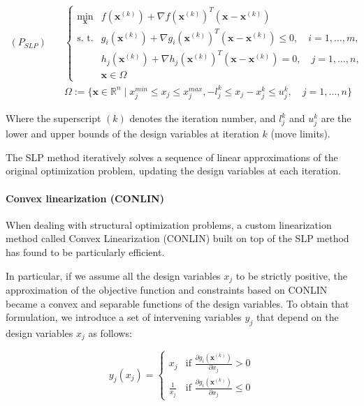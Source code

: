 \begin{equation}
    \begin{aligned}
        (P_{SLP}) \quad & \begin{cases}
                              \min_{\bm{x}} & f(\bm{x}^{(k)}) + \nabla f(\bm{x}^{(k)})^T (\bm{x} - \bm{x}^{(k)})                                    \\
                              \text{s. t.}  & g_i(\bm{x}^{(k)}) + \nabla g_i(\bm{x}^{(k)})^T (\bm{x} - \bm{x}^{(k)}) \leq 0, \quad i = 1, \dots, m, \\
                                            & h_j(\bm{x}^{(k)}) + \nabla h_j(\bm{x}^{(k)})^T (\bm{x} - \bm{x}^{(k)}) = 0, \quad j = 1, \dots, n,    \\
                                            & \bm{x} \in \Omega
                          \end{cases}      \\
                        & \Omega := \{ \bm{x} \in \mathbb{R}^n \mid x_j^{min} \leq x_j \leq x_j^{max}, -l_j^k \leq x_j - x_j^k \leq u_j^k , \quad j = 1, \dots, n \}
    \end{aligned}
    \label{eq:slp_optimization_problem}
\end{equation}

Where the superscript $(k)$ denotes the iteration number, and $l_j^k$ and $u_j^k$ are the lower and upper bounds of the design variables at iteration $k$ (move limits).

The SLP method iteratively solves a sequence of linear approximations of the original optimization problem, updating the design variables at each iteration.

\paragraph{Convex linearization (CONLIN)}

When dealing with structural optimization problems, a custom linearization method called Convex Linearization (CONLIN) built on top of the SLP method has found to be particularly efficient.

In particular, if we assume all the design variables $x_j$ to be strictly positive, the approximation of the objective function and constraints based on CONLIN became a convex and separable functions of the design variables.
To obtain that formulation, we introduce a set of intervening variables $y_j$ that depend on the design variables $x_j$ as follows:

\begin{equation}
    y_j(x_j) = \begin{cases}
        x_j           & \text{if } \frac{\partial g_i(\bm{x}^{(k)})}{\partial x_j} > 0    \\
        \frac{1}{x_j} & \text{if } \frac{\partial g_i(\bm{x}^{(k)})}{\partial x_j} \leq 0
    \end{cases}
    \label{eq:intervening_variables}
\end{equation}

